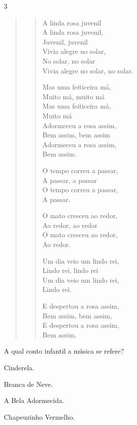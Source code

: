 \num{3}

\begin{quote}
\begin{verse}
A linda rosa juvenil\\
A linda rosa juvenil,\\
Juvenil, juvenil\\
Vivia alegre no solar,\\
No solar, no solar\\
Vivia alegre no solar, no solar.

Mas uma feiticeira má,\\
Muito má, muito má\\
Mas uma feiticeira má,\\
Muito má\\
Adormeceu a rosa assim,\\
Bem assim, bem assim\\
Adormeceu a rosa assim,\\
Bem assim.

O tempo correu a passar,\\
A passar, a passar\\
O tempo correu a passar,\\
A passar.

O mato cresceu ao redor,\\
Ao redor, ao redor\\
O mato cresceu ao redor,\\
Ao redor.

Um dia veio um lindo rei,\\
Lindo rei, lindo rei\\
Um dia veio um lindo rei,\\
Lindo rei.

E despertou a rosa assim,\\
Bem assim, bem assim,\\
E despertou a rosa assim,\\
Bem assim.
\end{verse}

\end{quote}

A qual conto infantil a música se refere?

\begin{escolha}
\item Cinderela.

\item Branca de Neve.

\item A Bela Adormecida.

\item Chapeuzinho Vermelho.
\end{escolha}


